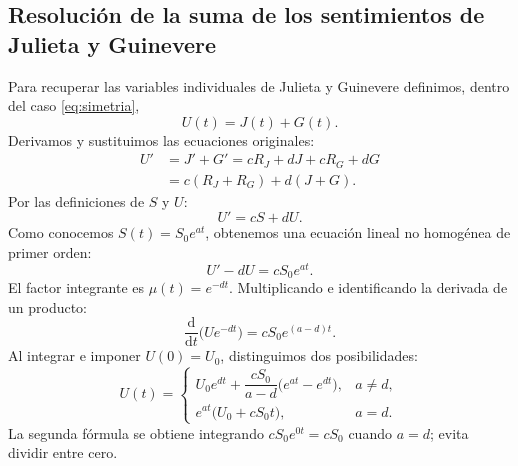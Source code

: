 \documentclass[10pt,letterpaper]{article}
\newcommand{\RJ}{R_{J}}
\newcommand{\RG}{R_{G}}
\newcommand{\dd}{\mathrm{d}}
\begin{document}
\subsection{Resolución de la suma de los sentimientos de Julieta y Guinevere}
Para recuperar las variables individuales de Julieta y Guinevere definimos, dentro del caso \eqref{eq:simetria},
\begin{equation}\label{eq:defU}
U(t)=J(t)+G(t).
\end{equation}
Derivamos y sustituimos las ecuaciones originales:
\begin{align}
U'&=J'+G'=c\RJ+dJ+c\RG+dG\\
&=c(\RJ+\RG)+d(J+G).
\end{align}
Por las definiciones de $S$ y $U$:
\begin{equation}\label{eq:Uprime}
\boxed{U'=cS+dU.}
\end{equation}
Como conocemos $S(t)=S_0e^{at}$, obtenemos una ecuación lineal no homogénea de primer orden:
\begin{equation}
U'-dU=cS_0e^{at}.
\end{equation}
El factor integrante es $\mu(t)=e^{-dt}$. Multiplicando e identificando la derivada de un producto:
\begin{equation}
\frac{\dd}{\dd t}\bigl(Ue^{-dt}\bigr)=cS_0e^{(a-d)t}.
\end{equation}
Al integrar e imponer $U(0)=U_0$, distinguimos dos posibilidades:
\begin{equation}\label{eq:Usol}
\boxed{U(t)=
\begin{cases}
U_0e^{dt}+\dfrac{cS_0}{a-d}\bigl(e^{at}-e^{dt}\bigr),&a\ne d,\\[8pt]
e^{at}\bigl(U_0+cS_0t\bigr),&a=d.
\end{cases}}
\end{equation}
La segunda fórmula se obtiene integrando $cS_0e^{0t}=cS_0$ cuando $a=d$; evita dividir entre cero.
\end{document}
